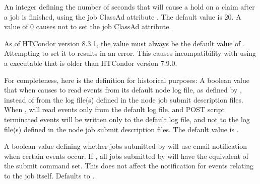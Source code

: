 \begin{description}
\label{param:DAGmanHoldClaimTime}
\item[\Macro{DAGMAN\_HOLD\_CLAIM\_TIME}]
  An integer defining the number of seconds that  will cause a
  hold on a claim after a job is finished, 
  using the job ClassAd attribute .
  The default value is 20. 
  A value of 0 causes  not to set the job ClassAd attribute.

\label{param:DAGmanAlwaysUseNodeLog}
\item[\Macro{DAGMAN\_ALWAYS\_USE\_NODE\_LOG}]
  As of HTCondor version 8.3.1, the value must always be the default 
  value of .  
  Attempting to set it to  results in an error. 
  This causes incompatibility with using a  executable 
  that is older than HTCondor version 7.9.0.

  For completeness, here is the definition for historical purposes: 
  A boolean value that when   causes  to read
  events from its default node log file, as defined by
  , instead of from the log file(s)
  defined in the node job submit description files.
  When ,
   will read events only from the default log
  file, and POST script terminated events will
  be written only to the default log file, and not to the
  log file(s) defined in the node job submit description files.
  The default value is .

\label{param:DAGmanSuppressNotification}
\item[\Macro{DAGMAN\_SUPPRESS\_NOTIFICATION}]
  A boolean value defining whether jobs submitted by  will use
  email notification when certain events occur.  
  If , 
  all jobs submitted by  will have the equivalent of the
  submit command  set. 
  This does not affect the notification for events relating to 
  the  job itself. 
  Defaults to .


\end{description}

